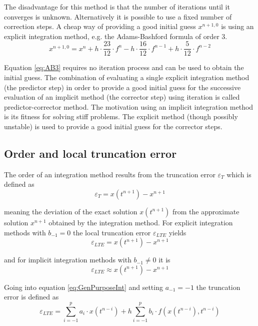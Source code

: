 The disadvantage for this method is that the number of iterations
until it converges is unknown.  Alternatively it is possible to use a
fixed number of correction steps.  A cheap way of providing a good
initial guess $x^{n+1,0}$ is using an explicit integration method,
e.g. the Adams-Bashford formula of order 3.
\begin{equation}
\label{eq:AB3}
x^{n+1,0} = x^{n} + h\cdot \dfrac{23}{12}\cdot f^{n} - h\cdot \dfrac{16}{12}\cdot f^{n-1} + h\cdot \dfrac{5}{12}\cdot f^{n-2}
\end{equation}

Equation \eqref{eq:AB3} requires no iteration process and can be used
to obtain the initial guess.  The combination of evaluating a single
explicit integration method (the predictor step) in order to provide a
good initial guess for the successive evaluation of an implicit method
(the corrector step) using iteration is called predictor-corrector
method.  The motivation using an implicit integration method is its
fitness for solving stiff problems.  The explicit method (though
possibly unstable) is used to provide a good initial guess for the
corrector steps.

\subsection{Order and local truncation error}

The order of an integration method results from the truncation error
$\varepsilon_T$ which is defined as
\begin{equation}
\varepsilon_T = x\left(t^{n+1}\right) - x^{n+1}
\end{equation}

meaning the deviation of the exact solution $x\left(t^{n+1}\right)$
from the approximate solution $x^{n+1}$ obtained by the integration
method.  For explicit integration methods with $b_{-1} = 0$ the local
truncation error $\varepsilon_{LTE}$ yields
\begin{equation}
\varepsilon_{LTE} = x\left(t^{n+1}\right) - x^{n+1}
\end{equation}

and for implicit integration methods with $b_{-1} \ne 0$ it is
\begin{equation}
\varepsilon_{LTE} \approx x\left(t^{n+1}\right) - x^{n+1}
\end{equation}

Going into equation \eqref{eq:GenPurposeInt} and setting $a_{-1} = -1$
the truncation error is defined as
\begin{equation}
\label{eq:LTE}
\varepsilon_{LTE} = \sum^p_{i=-1} a_i\cdot x\left(t^{n-i}\right) + h \sum^p_{i=-1} b_i\cdot f(x\left(t^{n-i}\right), t^{n-i})
\end{equation}


